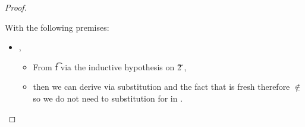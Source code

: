 \begin{lemma}
\begin{proof}
\begin{case}[B-BetaMulti]
\begin{itemize}
\begin{subcase}[T-App]
  With the following premises:
\begin{itemize}
  \item
{\judgementrewrite{{\propenv{}},{\thenprop{\propp{}}}}
                  {}
                  { {}{\x{}}}
                  {\replacefor
                   {
                               {}}
                             {}
                             {\x{}}}
                  {\replacefor
                          {}
                             {}
                             {\x{}}}
                  {}
                        },
    \begin{itemize}
      \item From
{\judgementrewrite{{\propenv{}},{\isprop{\s{}}{\x{}}}}
                  {}
                  {\t{f}}
               {
                                       {}}
                          {}
                          {}}
          via the inductive hypothesis on 
  \opsem {\openv{}}
         { {\v{2}}}
         {\v{}},
      \item then we can derive
{\judgementrewrite{{\propenv{}}}
                  {}
                  { {}{\x{}}}
                  {\replacefor
                   {
                               {}}
                             {}
                             {\x{}}}
                  {\replacefor
                          {}
                             {}
                             {\x{}}}
                  {}
                        } via substitution and the fact that {\x{}} is fresh 
                        therefore \x{} $\not\in$ \fv{\propenv{}} so we do not need to substitution for \x{} in \propenv{}. %
                        

\end{itemize}
\end{itemize}
\end{subcase}
\end{itemize}
\end{case}
\end{proof}
\end{lemma}
